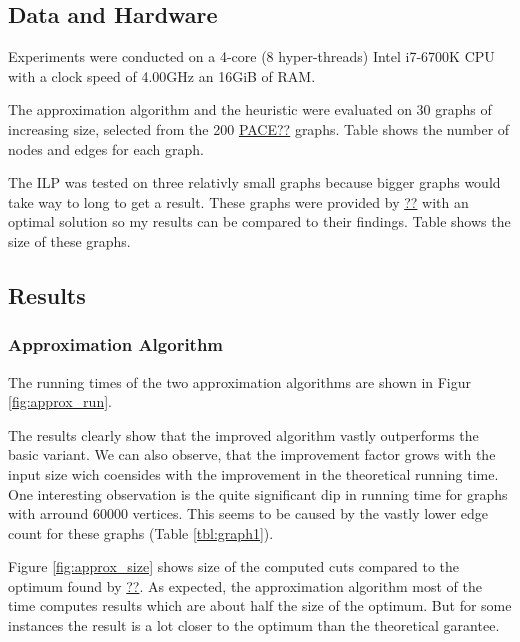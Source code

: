 \documentclass[twocolumn]{article}
\begin{document}
\subsection{Data and Hardware}%
\label{sub:Data and Hardware}

Experiments were conducted on a 4-core (8 hyper-threads) Intel i7-6700K CPU with a clock speed
of 4.00GHz an 16GiB of RAM.

The approximation algorithm and the heuristic were evaluated on 30 graphs of increasing size,
selected from the 200 \href{00}{PACE??} graphs.
Table  shows the number of nodes and edges for each graph.

The ILP was tested on three relativly small graphs because bigger graphs would take way to long to get a result.
These graphs were provided by \href{??}{??} with an optimal solution so my results can be compared to their findings.
Table  shows the size of these graphs.

\subsection{Results}%
\label{sub:Results}

\subsubsection{Approximation Algorithm}
The running times of the two approximation algorithms are shown in Figur \ref{fig:approx_run}.

The results clearly show that the improved algorithm vastly outperforms the basic variant.
We can also observe, that the improvement factor grows with the input size wich coensides with the improvement in
the theoretical running time.
One interesting observation is the quite significant dip in running time for graphs with arround 60000 vertices.
This seems to be caused by the vastly lower edge count for these graphs (Table \ref{tbl:graph1}).

Figure \ref{fig:approx_size} shows size of the computed cuts compared to the optimum found by \href{??}{??}.
As expected, the approximation algorithm most of the time computes results which are about half the size of the optimum.
But for some instances the result is a lot closer to the optimum than the theoretical garantee.
\end{document}
